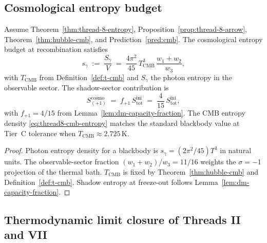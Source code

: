 \subsection{Cosmological entropy budget}
\label{sec:wave5-thread8:cosmo}

\begin{proposition}
\label{prop:thread-8-cosmo-entropy}
Assume Theorem~\ref{thm:thread-8-entropy},
Proposition~\ref{prop:thread-8-arrow},
Theorem~\ref{thm:hubble-cmb}, and Prediction~\ref{pred:cmb}. The cosmological
entropy budget at recombination satisfies
\begin{equation}\label{eq:thread8-cmb-entropy}
  s_\gamma
  \;:=\;
  \frac{S_\gamma}{V}
  \;=\;
  \frac{4\pi^2}{45}\,
  T_{\mathrm{CMB}}^3\,
  \frac{w_1+w_2}{w_3},
\end{equation}
with $T_{\mathrm{CMB}}$ from Definition~\ref{def:t-cmb} and
$S_\gamma$ the photon entropy in the observable sector. The shadow-sector
contribution is
\begin{equation}\label{eq:thread8-shadow-entropy}
  S_{(+1)}^{\mathrm{cosmo}}
  \;=\;
  f_{+1}\,S_{\mathrm{tot}}^{\mathrm{ini}}
  \;=\;
  \frac{4}{15}\,S_{\mathrm{tot}}^{\mathrm{ini}},
\end{equation}
with $f_{+1}=4/15$ from Lemma~\ref{lem:dm-capacity-fraction}. The CMB
entropy density \eqref{eq:thread8-cmb-entropy} matches the standard
blackbody value at Tier~C tolerance when $T_{\mathrm{CMB}}\approx 2.725\,\mathrm{K}$.
\end{proposition}

\begin{proof}
Photon entropy density for a blackbody is $s_\gamma=(2\pi^2/45)T^3$ in natural
units. The observable-sector fraction $(w_1+w_2)/w_3=11/16$ weights the
$\sigma=-1$ projection of the thermal bath. $T_{\mathrm{CMB}}$ is fixed by
Theorem~\ref{thm:hubble-cmb} and Definition~\ref{def:t-cmb}. Shadow entropy at
freeze-out follows Lemma~\ref{lem:dm-capacity-fraction}.
\end{proof}

\subsection{Thermodynamic limit closure of Threads II and VII}
\label{sec:wave5-thread8:closure-limit}

